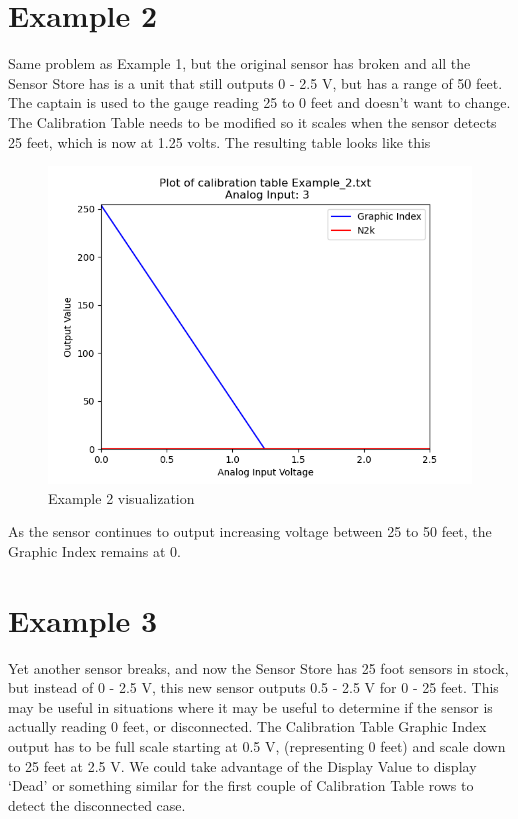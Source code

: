 \documentclass[12pt, letterpaper, twoside, titlepage]{article}
\begin{document}

\section{Example 2}
Same problem as Example 1, but the original sensor has broken and all the Sensor Store has is a unit that still outputs 0 - 2.5 V, but has a range of 50 feet.  The captain is used to the gauge reading 25 to 0 feet and doesn’t want to change.  The Calibration Table needs to be modified so it scales when the sensor detects 25 feet, which is now at 1.25 volts.  The resulting table looks like this

\begin{figure}[hbt!]
  \includegraphics[width=\linewidth]{Example_2.txt.png}
  \centering
  \caption{Example 2 visualization}
  \label{fig:Example_2}
\end{figure}


As the sensor continues to output increasing voltage between 25 to 50 feet, the Graphic Index remains at 0.

\section{Example 3}
Yet another sensor breaks, and now the Sensor Store has 25 foot sensors in stock, but instead of 0 - 2.5 V, this new sensor outputs  0.5  -  2.5 V for 0 - 25 feet.  This may be useful in situations where it may be useful to determine if the sensor is actually reading 0 feet, or disconnected. The Calibration Table Graphic Index output has to be full scale starting at 0.5 V, (representing 0 feet) and scale down to 25 feet at 2.5 V.  We could take advantage of the Display Value to display ‘Dead’ or something similar for the first couple of Calibration Table rows to detect the disconnected case. 
\end{document}
